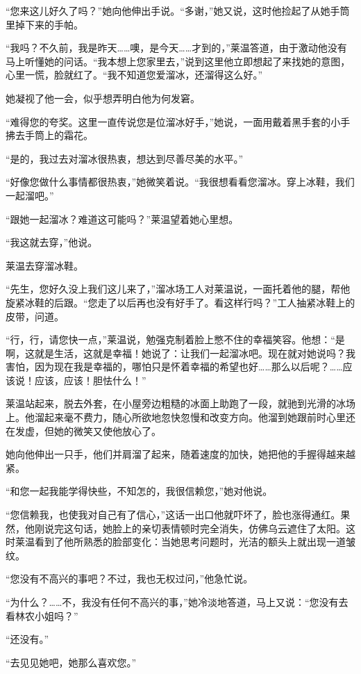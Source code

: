 \par “您来这儿好久了吗？”她向他伸出手说。“多谢，”她又说，这时他捡起了从她手筒里掉下来的手帕。
\par “我吗？不久前，我是昨天……噢，是今天……才到的，”莱温答道，由于激动他没有马上听懂她的问话。“我本想上您家里去，”说到这里他立即想起了来找她的意图，心里一慌，脸就红了。“我不知道您爱溜冰，还溜得这么好。”
\par 她凝视了他一会，似乎想弄明白他为何发窘。
\par “难得您的夸奖。这里一直传说您是位溜冰好手，”她说，一面用戴着黑手套的小手拂去手筒上的霜花。
\par “是的，我过去对溜冰很热衷，想达到尽善尽美的水平。”
\par “好像您做什么事情都很热衷，”她微笑着说。“我很想看看您溜冰。穿上冰鞋，我们一起溜吧。”
\par “跟她一起溜冰？难道这可能吗？”莱温望着她心里想。
\par “我这就去穿，”他说。
\par 莱温去穿溜冰鞋。
\par “先生，您好久没上我们这儿来了，”溜冰场工人对莱温说，一面托着他的腿，帮他旋紧冰鞋的后跟。“您走了以后再也没有好手了。看这样行吗？”工人抽紧冰鞋上的皮带，问道。
\par “行，行，请您快一点，”莱温说，勉强克制着脸上憋不住的幸福笑容。他想：“是啊，这就是生活，这就是幸福！她说了：让我们一起溜冰吧。现在就对她说吗？我害怕，因为现在我是幸福的，哪怕只是怀着幸福的希望也好……那么以后呢？……应该说！应该，应该！胆怯什么！”
\par 莱温站起来，脱去外套，在小屋旁边粗糙的冰面上助跑了一段，就驰到光滑的冰场上。他溜起来毫不费力，随心所欲地忽快忽慢和改变方向。他溜到她跟前时心里还在发虚，但她的微笑又使他放心了。
\par 她向他伸出一只手，他们并肩溜了起来，随着速度的加快，她把他的手握得越来越紧。
\par “和您一起我能学得快些，不知怎的，我很信赖您，”她对他说。
\par “您信赖我，也使我对自己有了信心，”这话一出口他就吓坏了，脸也涨得通红。果然，他刚说完这句话，她脸上的亲切表情顿时完全消失，仿佛乌云遮住了太阳。这时莱温看到了他所熟悉的脸部变化：当她思考问题时，光洁的额头上就出现一道皱纹。
\par “您没有不高兴的事吧？不过，我也无权过问，”他急忙说。
\par “为什么？……不，我没有任何不高兴的事，”她冷淡地答道，马上又说：“您没有去看林农小姐吗？”
\par “还没有。”
\par “去见见她吧，她那么喜欢您。”
